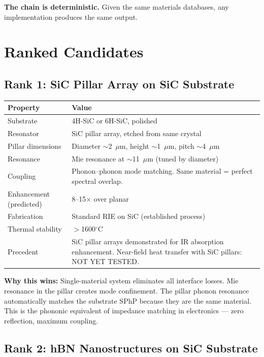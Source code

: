 \documentclass[11pt, a4paper]{article}
\begin{document}
\textbf{The chain is deterministic.} Given the same materials
databases, any implementation produces the same output.

\section{Ranked Candidates}

\subsection{Rank 1: SiC Pillar Array on SiC Substrate}

\begin{center}
\begin{tabular}{@{}lp{9cm}@{}}
\toprule
\textbf{Property} & \textbf{Value} \\
\midrule
Substrate & 4H-SiC or 6H-SiC, polished \\
Resonator & SiC pillar array, etched from same crystal \\
Pillar dimensions & Diameter $\sim$2~$\mu$m, height
  $\sim$1~$\mu$m, pitch $\sim$4~$\mu$m \\
Resonance & Mie resonance at $\sim$11~$\mu$m (tuned by
  diameter) \\
Coupling & Phonon--phonon mode matching. Same material
  = perfect spectral overlap. \\
Enhancement (predicted) & 8--15$\times$ over planar \\
Fabrication & Standard RIE on SiC (established process) \\
Thermal stability & $>$1600$^\circ$C \\
\midrule
Precedent & SiC pillar arrays demonstrated for IR
  absorption enhancement. Near-field heat transfer with
  SiC pillars: \textcolor{nm-orange}{NOT YET TESTED.} \\
\bottomrule
\end{tabular}
\end{center}

\textbf{Why this wins:} Single-material system eliminates
all interface losses. Mie resonance in the pillar creates
mode confinement. The pillar phonon resonance automatically
matches the substrate SPhP because they are the same
material. This is the phononic equivalent of impedance
matching in electronics --- zero reflection, maximum
coupling.

\subsection{Rank 2: hBN Nanostructures on SiC Substrate}
\end{document}
